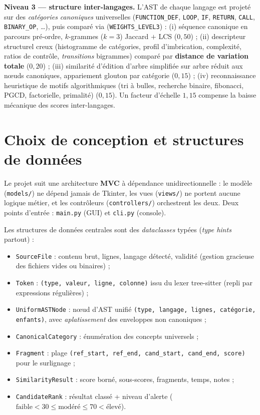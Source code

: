 \documentclass[10pt,a4paper]{article}
\begin{document}
\textbf{Niveau 3 --- structure inter-langages.} L'AST de chaque langage est
projeté sur des \emph{catégories canoniques} universelles
(\texttt{FUNCTION\_DEF}, \texttt{LOOP}, \texttt{IF}, \texttt{RETURN},
\texttt{CALL}, \texttt{BINARY\_OP}, \ldots), puis comparé via
(\texttt{WEIGHTS\_LEVEL3}) :
(i) séquence canonique en parcours pré-ordre, $k$-grammes ($k=3$) Jaccard
$+$ LCS ($0{,}50$) ;
(ii) descripteur structurel creux (histogramme de catégories, profil
d'imbrication, complexité, ratios de contrôle, \emph{transitions} bigrammes)
comparé par \textbf{distance de variation totale} ($0{,}20$) ;
(iii) similarité d'édition d'arbre simplifiée sur arbre réduit aux nœuds
canoniques, appariement glouton par catégorie ($0{,}15$) ;
(iv) reconnaissance heuristique de motifs algorithmiques (tri à bulles,
recherche binaire, fibonacci, PGCD, factorielle, primalité) ($0{,}15$).
Un facteur d'échelle $1{,}15$ compense la baisse mécanique des scores
inter-langages.

\section{Choix de conception et structures de données}

Le projet suit une architecture \textbf{MVC} à dépendance unidirectionnelle :
le modèle (\texttt{models/}) ne dépend jamais de Tkinter, les vues
(\texttt{views/}) ne portent aucune logique métier, et les contrôleurs
(\texttt{controllers/}) orchestrent les deux. Deux points d'entrée :
\texttt{main.py} (GUI) et \texttt{cli.py} (console).

Les structures de données centrales sont des \emph{dataclasses} typées
(\emph{type hints} partout) :

\begin{itemize}
  \item \texttt{SourceFile} : contenu brut, lignes, langage détecté, validité
        (gestion gracieuse des fichiers vides ou binaires) ;
  \item \texttt{Token} : \texttt{(type, valeur, ligne, colonne)} issu du
        lexer tree-sitter (repli par expressions régulières) ;
  \item \texttt{UniformASTNode} : nœud d'AST unifié
        \texttt{(type, langage, lignes, catégorie, enfants)}, avec
        \emph{aplatissement} des enveloppes non canoniques ;
  \item \texttt{CanonicalCategory} : énumération des concepts universels ;
  \item \texttt{Fragment} : plage \texttt{(ref\_start, ref\_end,
        cand\_start, cand\_end, score)} pour le surlignage ;
  \item \texttt{SimilarityResult} : score borné, sous-scores, fragments,
        temps, notes ;
  \item \texttt{CandidateRank} : résultat classé + niveau d'alerte
        ($\text{faible} < 30 \le \text{modéré} \le 70 < \text{élevé}$).
\end{itemize}
\end{document}
